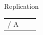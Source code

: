 \documentclass[final]{beamer}
\begin{document}
\begin{frame}{}
\begin{textblock}{67}
\begin{block}{Replication}
\begin{tabular}{c c c}
 / A
\end{tabular}
\end{block}
\end{textblock}
\end{frame}
\end{document}
